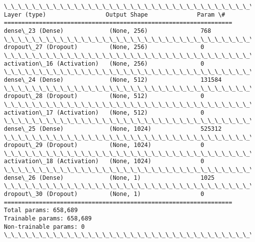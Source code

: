 \documentclass[11pt]{article}
\begin{document}
    \begin{Verbatim}[commandchars=\\\{\}]
\_\_\_\_\_\_\_\_\_\_\_\_\_\_\_\_\_\_\_\_\_\_\_\_\_\_\_\_\_\_\_\_\_\_\_\_\_\_\_\_\_\_\_\_\_\_\_\_\_\_\_\_\_\_\_\_\_\_\_\_\_\_\_\_\_
Layer (type)                 Output Shape              Param \#   
=================================================================
dense\_23 (Dense)             (None, 256)               768       
\_\_\_\_\_\_\_\_\_\_\_\_\_\_\_\_\_\_\_\_\_\_\_\_\_\_\_\_\_\_\_\_\_\_\_\_\_\_\_\_\_\_\_\_\_\_\_\_\_\_\_\_\_\_\_\_\_\_\_\_\_\_\_\_\_
dropout\_27 (Dropout)         (None, 256)               0         
\_\_\_\_\_\_\_\_\_\_\_\_\_\_\_\_\_\_\_\_\_\_\_\_\_\_\_\_\_\_\_\_\_\_\_\_\_\_\_\_\_\_\_\_\_\_\_\_\_\_\_\_\_\_\_\_\_\_\_\_\_\_\_\_\_
activation\_16 (Activation)   (None, 256)               0         
\_\_\_\_\_\_\_\_\_\_\_\_\_\_\_\_\_\_\_\_\_\_\_\_\_\_\_\_\_\_\_\_\_\_\_\_\_\_\_\_\_\_\_\_\_\_\_\_\_\_\_\_\_\_\_\_\_\_\_\_\_\_\_\_\_
dense\_24 (Dense)             (None, 512)               131584    
\_\_\_\_\_\_\_\_\_\_\_\_\_\_\_\_\_\_\_\_\_\_\_\_\_\_\_\_\_\_\_\_\_\_\_\_\_\_\_\_\_\_\_\_\_\_\_\_\_\_\_\_\_\_\_\_\_\_\_\_\_\_\_\_\_
dropout\_28 (Dropout)         (None, 512)               0         
\_\_\_\_\_\_\_\_\_\_\_\_\_\_\_\_\_\_\_\_\_\_\_\_\_\_\_\_\_\_\_\_\_\_\_\_\_\_\_\_\_\_\_\_\_\_\_\_\_\_\_\_\_\_\_\_\_\_\_\_\_\_\_\_\_
activation\_17 (Activation)   (None, 512)               0         
\_\_\_\_\_\_\_\_\_\_\_\_\_\_\_\_\_\_\_\_\_\_\_\_\_\_\_\_\_\_\_\_\_\_\_\_\_\_\_\_\_\_\_\_\_\_\_\_\_\_\_\_\_\_\_\_\_\_\_\_\_\_\_\_\_
dense\_25 (Dense)             (None, 1024)              525312    
\_\_\_\_\_\_\_\_\_\_\_\_\_\_\_\_\_\_\_\_\_\_\_\_\_\_\_\_\_\_\_\_\_\_\_\_\_\_\_\_\_\_\_\_\_\_\_\_\_\_\_\_\_\_\_\_\_\_\_\_\_\_\_\_\_
dropout\_29 (Dropout)         (None, 1024)              0         
\_\_\_\_\_\_\_\_\_\_\_\_\_\_\_\_\_\_\_\_\_\_\_\_\_\_\_\_\_\_\_\_\_\_\_\_\_\_\_\_\_\_\_\_\_\_\_\_\_\_\_\_\_\_\_\_\_\_\_\_\_\_\_\_\_
activation\_18 (Activation)   (None, 1024)              0         
\_\_\_\_\_\_\_\_\_\_\_\_\_\_\_\_\_\_\_\_\_\_\_\_\_\_\_\_\_\_\_\_\_\_\_\_\_\_\_\_\_\_\_\_\_\_\_\_\_\_\_\_\_\_\_\_\_\_\_\_\_\_\_\_\_
dense\_26 (Dense)             (None, 1)                 1025      
\_\_\_\_\_\_\_\_\_\_\_\_\_\_\_\_\_\_\_\_\_\_\_\_\_\_\_\_\_\_\_\_\_\_\_\_\_\_\_\_\_\_\_\_\_\_\_\_\_\_\_\_\_\_\_\_\_\_\_\_\_\_\_\_\_
dropout\_30 (Dropout)         (None, 1)                 0         
=================================================================
Total params: 658,689
Trainable params: 658,689
Non-trainable params: 0
\_\_\_\_\_\_\_\_\_\_\_\_\_\_\_\_\_\_\_\_\_\_\_\_\_\_\_\_\_\_\_\_\_\_\_\_\_\_\_\_\_\_\_\_\_\_\_\_\_\_\_\_\_\_\_\_\_\_\_\_\_\_\_\_\_

    \end{Verbatim}
\end{document}
